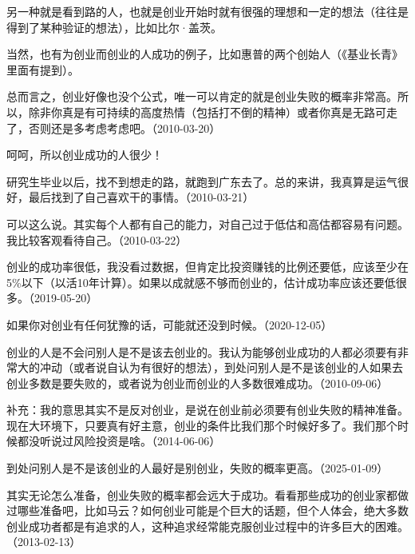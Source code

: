 另一种就是看到路的人，也就是创业开始时就有很强的理想和一定的想法（往往是得到了某种验证的想法），比如比尔·盖茨。

当然，也有为创业而创业的人成功的例子，比如惠普的两个创始人（《基业长青》里面有提到）。

总而言之，创业好像也没个公式，唯一可以肯定的就是创业失败的概率非常高。所以，除非你真是有可持续的高度热情（包括打不倒的精神）或者你真是无路可走了，否则还是多考虑考虑吧。（2010-03-20）


呵呵，所以创业成功的人很少！


研究生毕业以后，找不到想走的路，就跑到广东去了。总的来讲，我真算是运气很好，最后找到了自己喜欢干的事情。（2010-03-21）


可以这么说。其实每个人都有自己的能力，对自己过于低估和高估都容易有问题。我比较客观看待自己。（2010-03-22）


创业的成功率很低，我没看过数据，但肯定比投资赚钱的比例还要低，应该至少在5\%以下（以活10年计算）。如果以成就感不够而创业的，估计成功率应该还要低很多。（2019-05-20）

如果你对创业有任何犹豫的话，可能就还没到时候。（2020-12-05）

创业的人是不会问别人是不是该去创业的。我认为能够创业成功的人都必须要有非常大的冲动（或者说自认为有很好的想法），到处问别人是不是该创业的人如果去创业多数是要失败的，或者说为创业而创业的人多数很难成功。（2010-09-06）

补充：我的意思其实不是反对创业，是说在创业前必须要有创业失败的精神准备。现在大环境下，只要真有好主意，创业的条件比我们那个时候好多了。我们那个时候都没听说过风险投资是啥。（2014-06-06）

到处问别人是不是该创业的人最好是别创业，失败的概率更高。（2025-01-09）


其实无论怎么准备，创业失败的概率都会远大于成功。看看那些成功的创业家都做过哪些准备吧，比如马云？如何创业可能是个巨大的话题，但个人体会，绝大多数创业成功者都是有追求的人，这种追求经常能克服创业过程中的许多巨大的困难。（2013-02-13）

